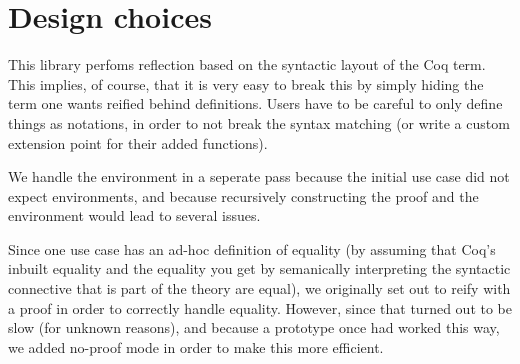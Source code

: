\documentclass[11pt,a4paper]{article}
\begin{document}
\section{Design choices}
This library perfoms reflection based on the syntactic layout of the Coq term. This implies, of course, that it is very easy to break this by simply hiding the term one wants reified behind definitions. Users have to be careful to only define things as notations, in order to not break the syntax matching (or write a custom extension point for their added functions).

We handle the environment in a seperate pass because the initial use case did not expect environments, and because recursively constructing the proof and the environment would lead to several issues.

Since one use case has an ad-hoc definition of equality (by assuming that Coq's inbuilt equality and the equality you get by semanically interpreting the syntactic connective that is part of the theory are equal), we originally set out to reify with a proof in order to correctly handle equality. However, since that turned out to be slow (for unknown reasons), and because a prototype once had worked this way, we added no-proof mode in order to make this more efficient.
\end{document}
